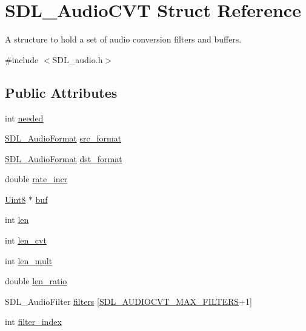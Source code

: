 \hypertarget{struct_s_d_l___audio_c_v_t}{}\section{S\+D\+L\+\_\+\+Audio\+C\+VT Struct Reference}
\label{struct_s_d_l___audio_c_v_t}


A structure to hold a set of audio conversion filters and buffers.  




{\ttfamily \#include $<$S\+D\+L\+\_\+audio.\+h$>$}

\subsection*{Public Attributes}
\begin{DoxyCompactItemize}
\item 
int \hyperlink{struct_s_d_l___audio_c_v_t_ac600a035a48df05e14d3712fd6953ad4}{needed}
\item 
\hyperlink{_s_d_l__audio_8h_a491ed103fd25d920c4e6b7495217ce66}{S\+D\+L\+\_\+\+Audio\+Format} \hyperlink{struct_s_d_l___audio_c_v_t_a6ae81231e017105e6d5e745a51732e16}{src\+\_\+format}
\item 
\hyperlink{_s_d_l__audio_8h_a491ed103fd25d920c4e6b7495217ce66}{S\+D\+L\+\_\+\+Audio\+Format} \hyperlink{struct_s_d_l___audio_c_v_t_a8f890d017be857a3b048bf00525736c6}{dst\+\_\+format}
\item 
double \hyperlink{struct_s_d_l___audio_c_v_t_ad886122c23a6673073baace31bff3b6c}{rate\+\_\+incr}
\item 
\hyperlink{_s_d_l__stdinc_8h_a2944638813a090aa23e62f4da842c3e2}{Uint8} $\ast$ \hyperlink{struct_s_d_l___audio_c_v_t_a080db27b929efa983c5161360ffce310}{buf}
\item 
int \hyperlink{struct_s_d_l___audio_c_v_t_aeaeb8c5a63c3ab96471fbfdf412c78ff}{len}
\item 
int \hyperlink{struct_s_d_l___audio_c_v_t_a5c60163f34d1947e5b166c23aba9879d}{len\+\_\+cvt}
\item 
int \hyperlink{struct_s_d_l___audio_c_v_t_ac9662d47cf2348b82b27b151150116b0}{len\+\_\+mult}
\item 
double \hyperlink{struct_s_d_l___audio_c_v_t_a5628ff5ccf711de9d77c0a4a9f57d2f0}{len\+\_\+ratio}
\item 
S\+D\+L\+\_\+\+Audio\+Filter \hyperlink{struct_s_d_l___audio_c_v_t_afeb8dc60716644de3b681653442de1db}{filters} \mbox{[}\hyperlink{_s_d_l__audio_8h_a3d38380ac4a45a68a0e1c1a7a02bd290}{S\+D\+L\+\_\+\+A\+U\+D\+I\+O\+C\+V\+T\+\_\+\+M\+A\+X\+\_\+\+F\+I\+L\+T\+E\+RS}+1\mbox{]}
\item 
int \hyperlink{struct_s_d_l___audio_c_v_t_a35093b3ad3331c17416c593a76012b63}{filter\+\_\+index}
\end{DoxyCompactItemize}


